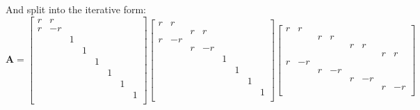 \documentclass[letterpaper]{article}
\begin{document}
And split into the iterative form:
\[
\mathbf{A} = 
\begin{bmatrix}
 r   &  r   &       &       &       &       &       &       \\
 r   & -r   &       &       &       &       &       &       \\
     &      &  1    &       &       &       &       &       \\
     &      &       &  1    &       &       &       &       \\
     &      &       &       &   1   &       &       &       \\
     &      &       &       &       &  1    &       &       \\
     &      &       &       &       &       &  1    &       \\
     &      &       &       &       &       &       &  1    \\
\end{bmatrix}
\begin{bmatrix}
 r   &  r   &       &       &       &       &       &       \\
     &      &  r    &   r   &       &       &       &       \\
 r   & -r   &       &       &       &       &       &       \\
     &      &  r    &  -r   &       &       &       &       \\
     &      &       &       &   1   &       &       &       \\
     &      &       &       &       &  1    &       &       \\
     &      &       &       &       &       &  1    &       \\
     &      &       &       &       &       &       &  1    \\
\end{bmatrix}
\begin{bmatrix}
 r   &  r   &       &       &       &       &       &       \\
     &      &  r    &   r   &       &       &       &       \\
     &      &       &       &   r   &   r   &       &       \\
     &      &       &       &       &       &  r    &  r    \\
 r   & -r   &       &       &       &       &       &       \\
     &      &  r    &  -r   &       &       &       &       \\
     &      &       &       &   r   &  -r   &       &       \\
     &      &       &       &       &       &  r    & -r    \\
\end{bmatrix}
\]
\end{document}
